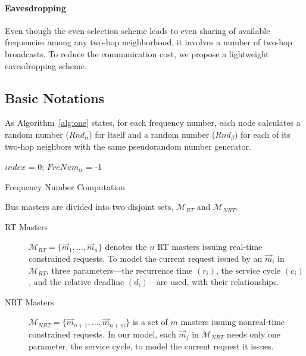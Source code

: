\documentclass[format=acmsmall, review=false]{acmart}
\begin{document}
\paragraph{Eavesdropping}

Even though the even selection scheme leads to even sharing of
available frequencies among any two-hop neighborhood, it involves a
number of two-hop broadcasts. To reduce the communication cost, we
propose a lightweight eavesdropping scheme.

\subsection{Basic Notations}

As Algorithm~\ref{alg:one} states, for each frequency
number, each node calculates a random number (${\textit{Rnd}}_{\alpha}$) for
itself and a random number (${\textit{Rnd}}_{\beta}$) for each of its two-hop
neighbors with the same pseudorandom number generator.

\begin{algorithm}[t]
	\SetAlgoNoLine
	$index$ = 0; $FreNum_{\alpha}$ = -1\;
	\caption{Frequency Number Computation}
	\label{alg:one}
\end{algorithm}


Bus masters are divided into two disjoint sets, $\mathcal{M}_{RT}$
and $\mathcal{M}_{NRT}$.
\begin{description}
	\item[RT Masters]
	$\mathcal{M}_{RT}=\{ \vec{m}_{1},\dots,\vec{m}_{n}\}$ denotes the
	$n$ RT masters issuing real-time constrained requests. To model the
	current request issued by an $\vec{m}_{i}$ in $\mathcal{M}_{RT}$,
	three parameters---the recurrence time $(r_i)$, the service cycle
	$(c_i)$, and the relative deadline $(d_i)$---are used, with their
	relationships.
	\item[NRT Masters]
	$\mathcal{M}_{NRT}=\{ \vec{m}_{n+1},\dots,\vec{m}_{n+m}\}$ is a set
	of $m$ masters issuing nonreal-time constrained requests. In our
	model, each $\vec{m}_{j}$ in $\mathcal{M}_{NRT}$ needs only one
	parameter, the service cycle, to model the current request it
	issues.
\end{description}
\end{document}
